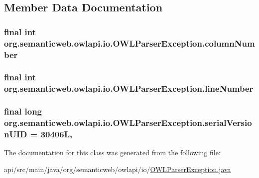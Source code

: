 \subsection{Member Data Documentation}
\hypertarget{classorg_1_1semanticweb_1_1owlapi_1_1io_1_1_o_w_l_parser_exception_af0ad50fb6962ba9b17a4e358e1b82d38}{
\subsubsection[{column\-Number}]{\setlength{\rightskip}{0pt plus 5cm}final int org.\-semanticweb.\-owlapi.\-io.\-O\-W\-L\-Parser\-Exception.\-column\-Number\hspace{0.3cm}{\ttfamily [private]}}}\label{classorg_1_1semanticweb_1_1owlapi_1_1io_1_1_o_w_l_parser_exception_af0ad50fb6962ba9b17a4e358e1b82d38}
\hypertarget{classorg_1_1semanticweb_1_1owlapi_1_1io_1_1_o_w_l_parser_exception_a5a5d515eefd8c2871627e152d86c03c2}{
\subsubsection[{line\-Number}]{\setlength{\rightskip}{0pt plus 5cm}final int org.\-semanticweb.\-owlapi.\-io.\-O\-W\-L\-Parser\-Exception.\-line\-Number\hspace{0.3cm}{\ttfamily [private]}}}\label{classorg_1_1semanticweb_1_1owlapi_1_1io_1_1_o_w_l_parser_exception_a5a5d515eefd8c2871627e152d86c03c2}
\hypertarget{classorg_1_1semanticweb_1_1owlapi_1_1io_1_1_o_w_l_parser_exception_afa348bd541048a15b4a35e559bf7a4e2}{
\subsubsection[{serial\-Version\-U\-I\-D}]{\setlength{\rightskip}{0pt plus 5cm}final long org.\-semanticweb.\-owlapi.\-io.\-O\-W\-L\-Parser\-Exception.\-serial\-Version\-U\-I\-D = 30406\-L\hspace{0.3cm}{\ttfamily [static]}, {\ttfamily [private]}}}\label{classorg_1_1semanticweb_1_1owlapi_1_1io_1_1_o_w_l_parser_exception_afa348bd541048a15b4a35e559bf7a4e2}


The documentation for this class was generated from the following file\-:\begin{DoxyCompactItemize}
\item 
api/src/main/java/org/semanticweb/owlapi/io/\hyperlink{_o_w_l_parser_exception_8java}{O\-W\-L\-Parser\-Exception.\-java}\end{DoxyCompactItemize}
